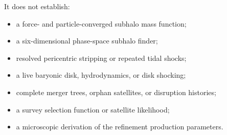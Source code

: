 It does not establish:
\begin{itemize}
\item a force- and particle-converged subhalo mass function;
\item a six-dimensional phase-space subhalo finder;
\item resolved pericentric stripping or repeated tidal shocks;
\item a live baryonic disk, hydrodynamics, or disk shocking;
\item complete merger trees, orphan satellites, or disruption histories;
\item a survey selection function or satellite likelihood;
\item a microscopic derivation of the refinement production parameters.
\end{itemize}
